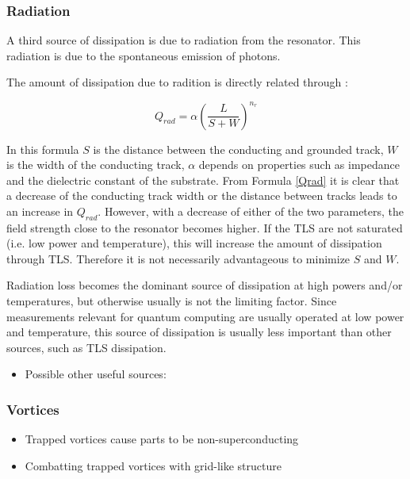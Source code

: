 \documentclass[12pt]{report}
\begin{document}
\subsubsection{Radiation}

A third source of dissipation is due to radiation from the resonator. This radiation is due to the spontaneous emission of photons.

The amount of dissipation due to radition is directly related through \cite{sage2011study,Mazin}:

\begin{equation}
    Q_{rad} = \alpha \left( \frac{L}{ S + W}\right)^{n_r}
    \label{Qrad}
\end{equation}

In this formula $S$ is the distance between the conducting and grounded track, $W$ is the width of the conducting track, $\alpha$ depends on properties such as impedance and the dielectric constant of the substrate. From Formula \ref{Qrad} it is clear that a decrease of the conducting track width or the distance between tracks leads to an increase in $Q_{rad}$. However, with a decrease of either of the two parameters, the field strength close to the resonator becomes higher. If the TLS are not saturated (i.e. low power and temperature), this will increase the amount of dissipation through TLS. Therefore it is not necessarily advantageous to minimize $S$ and $W$.

Radiation loss becomes the dominant source of dissipation at high powers and/or temperatures, but otherwise usually is not the limiting factor. Since measurements relevant for quantum computing are usually operated at low power and temperature, this source of dissipation is usually less important than other sources, such as TLS dissipation.

\begin{itemize}
    \item Possible other useful sources: \cite{denlinger1969radiation} \cite{khalil2011loss}
\end{itemize}



\subsubsection{Vortices}


\begin{itemize}
    \item Trapped vortices cause parts to be non-superconducting
    \item Combatting trapped vortices with grid-like structure
\end{itemize}
\end{document}
